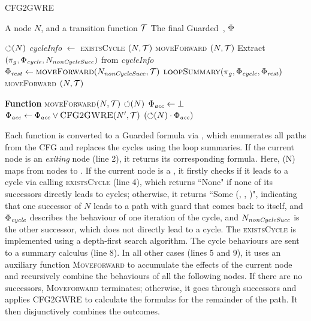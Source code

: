 \begin{algorithm}[!b]
  \caption{CFG2GWRE}
  \label{alg:cfg2GuardedomegaRE}
  \begin{algorithmic}[1]

  \REQUIRE A node $N$, and a transition function $\mathcal{T}$
  \ENSURE The final Guarded~\code{\omegaRE}, ${\mathrm{\Phi}}$

      \RETURN ${\circlearrowleft}(N)$
      \STATE \textit{cycleInfo} $\gets$ \textsc{existsCycle} $(N, \mathcal{T})$
          \RETURN \textsc{moveForward} $(N, \mathcal{T})$
      \ELSE
          \STATE Extract $(\pi_g, {\mathrm{\Phi}}_{\mathit{cycle}}, N_{\mathit{nonCycleSucc}})$ from \textit{cycleInfo}
          \STATE ${\mathrm{\Phi}}_{\mathit{rest}} \gets \textsc{moveForward}(N_{\mathit{nonCycleSucc}}, \mathcal{T})$
          \RETURN $\textsc{{loopSummary}}(\pi_g, {\mathrm{\Phi}}_{\mathit{cycle}}, {\mathrm{\Phi}}_{\mathit{rest}})$
      \ENDIF
  \ELSE
      \RETURN \textsc{moveForward} $(N, \mathcal{T})$
  \ENDIF

  \STATE

  \STATE \textbf{Function} \textsc{moveForward}$(N, \mathcal{T})$
      \RETURN ${\circlearrowleft}(N)$
  \ELSE
      \STATE ${\mathrm{\Phi}}_{\mathit{acc}} \gets \bot$
          \STATE ${\mathrm{\Phi}}_{\mathit{acc}} \gets {\ensuremath{\mathrm{\Phi}}}_{\mathit{acc}} \vee \textsc{CFG2GWRE}(N^\prime, \mathcal{T})$
      \ENDFOR
      \RETURN $({\circlearrowleft}(N) \cdot {\ensuremath{\mathrm{\Phi}}}_{\mathit{acc}})$
  \ENDIF
  

  \end{algorithmic}
\end{algorithm}


Each function is converted to a Guarded \code{\omegaRE} formula via , 
which enumerates all paths from the CFG and replaces the cycles using the loop summaries. 
If the current node is an \emph{exiting} node (line 2), it returns its corresponding \code{\effect} formula. 
Here, \code{\nodeEv}(N) maps from nodes to \code{\effect}.    
If the current node is a , 
it firstly checks if it leads to a cycle via calling \textsc{existsCycle}  (line 4), which 
returns ``None" if none of its successors directly leads to cycles; otherwise, it returns ``Some (, , )", indicating that one successor of $N$ leads to a path with guard  that comes back to itself, and ${\mathrm{\Phi}}_{\mathit{cycle}}$ describes the behaviour of one iteration of the cycle, 
and $N_{\mathit{nonCycleSucc}}$ is the other successor, which does not directly lead to a cycle. 
The \textsc{existsCycle} is implemented using a 
depth-first search algorithm. 
The cycle behaviours are sent to a summary calculus (line 8).   
In all other cases (lines 5 and 9), it uses an auxiliary function  \textsc{Moveforward} to accumulate the effects of the current node and 
recursively combine the behaviours of all the following nodes. If there are no successors, \textsc{Moveforward} terminates; otherwise, it 
goes through successors and applies \textsc{CFG2GWRE} 
to calculate the formulas for the remainder of the path. It then disjunctively combines the outcomes. 

